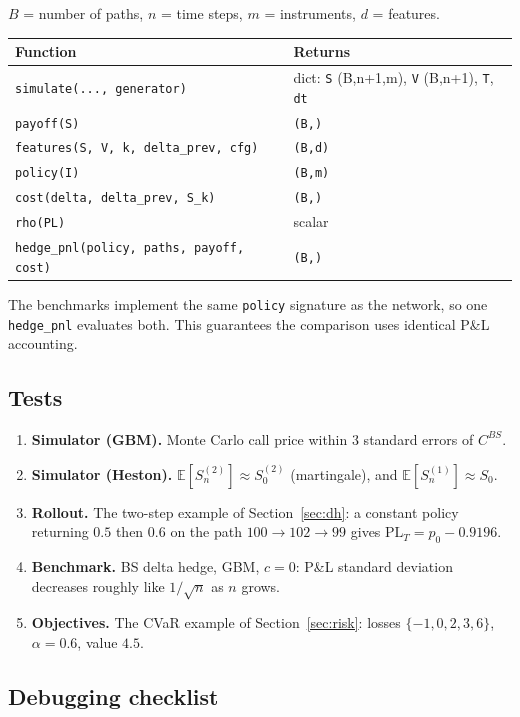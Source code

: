 \documentclass[11pt]{article}
\theoremstyle{definition}
\theoremstyle{remark}
\newcommand{\E}{\mathbb{E}}
\newcommand{\PL}{\mathrm{PL}}
\begin{document}
$B$ = number of paths, $n$ = time steps, $m$ = instruments, $d$ = features.
\begin{center}\small
\renewcommand{\arraystretch}{1.3}
\begin{tabular}{@{}ll@{}}
\toprule
Function & Returns\\
\midrule
\texttt{simulate(..., generator)} & dict: \texttt{S} (B,n+1,m), \texttt{V} (B,n+1), \texttt{T}, \texttt{dt}\\
\texttt{payoff(S)} & \texttt{(B,)}\\
\texttt{features(S, V, k, delta\_prev, cfg)} & \texttt{(B,d)}\\
\texttt{policy(I)} & \texttt{(B,m)}\\
\texttt{cost(delta, delta\_prev, S\_k)} & \texttt{(B,)}\\
\texttt{rho(PL)} & scalar\\
\texttt{hedge\_pnl(policy, paths, payoff, cost)} & \texttt{(B,)}\\
\bottomrule
\end{tabular}
\end{center}
The benchmarks implement the same \texttt{policy} signature as the network, so one \texttt{hedge\_pnl} evaluates both.
This guarantees the comparison uses identical P\&L accounting.

\subsection{Tests}

\begin{enumerate}[leftmargin=*]
  \item \textbf{Simulator (GBM).} Monte Carlo call price within 3 standard errors of $C^{BS}$.
  \item \textbf{Simulator (Heston).} $\E[S^{(2)}_n]\approx S^{(2)}_0$ (martingale), and $\E[S^{(1)}_n]\approx S_0$.
  \item \textbf{Rollout.} The two-step example of Section~\ref{sec:dh}: a constant policy returning $0.5$ then $0.6$ on the
        path $100\to102\to99$ gives $\PL_T=p_0-0.9196$.
  \item \textbf{Benchmark.} BS delta hedge, GBM, $c=0$: P\&L standard deviation decreases roughly like $1/\sqrt n$ as $n$ grows.
  \item \textbf{Objectives.} The CVaR example of Section~\ref{sec:risk}: losses $\{-1,0,2,3,6\}$, $\alpha=0.6$, value $4.5$.
\end{enumerate}

\subsection{Debugging checklist}
\end{document}
